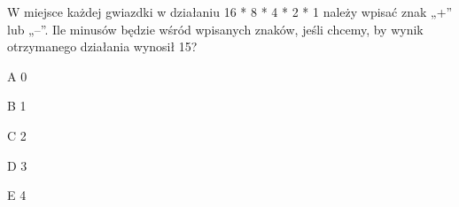\begin{tresc}
W miejsce każdej gwiazdki w działaniu 16 * 8 * 4 * 2 * 1 należy wpisać znak „+” lub „–”. Ile minusów będzie wśród wpisanych znaków, jeśli chcemy, by wynik otrzymanego działania wynosił 15?
\end{tresc}
\begin{wariant}{A} 0 \end{wariant}
\begin{wariant}{B} 1 \end{wariant}
\begin{wariant}{C} 2 \end{wariant}
\begin{wariant}{D} 3 \end{wariant}
\begin{wariant}{E} 4 \end{wariant}
